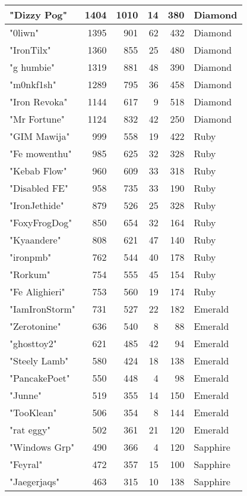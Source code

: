 \documentclass{article}
\begin{document}
\begin{table}[htbp]
\begin{tabular}{|l|r|r|r|r|l|}
"Dizzy Pog" & 1404 & 1010 & 14 & 380 & Diamond \\ \hline
"0liwn" & 1395 & 901 & 62 & 432 & Diamond \\ \hline
"IronTilx" & 1360 & 855 & 25 & 480 & Diamond \\ \hline
"g humbie" & 1319 & 881 & 48 & 390 & Diamond \\ \hline
"m0nkf1sh" & 1289 & 795 & 36 & 458 & Diamond \\ \hline
"Iron Revoka" & 1144 & 617 & 9 & 518 & Diamond \\ \hline
"Mr Fortune" & 1124 & 832 & 42 & 250 & Diamond \\ \hline
"GIM Mawija" & 999 & 558 & 19 & 422 & Ruby \\ \hline
"Fe mowenthu" & 985 & 625 & 32 & 328 & Ruby \\ \hline
"Kebab Flow" & 960 & 609 & 33 & 318 & Ruby \\ \hline
"Disabled FE" & 958 & 735 & 33 & 190 & Ruby \\ \hline
"IronJethide" & 879 & 526 & 25 & 328 & Ruby \\ \hline
"FoxyFrogDog" & 850 & 654 & 32 & 164 & Ruby \\ \hline
"Kyaandere" & 808 & 621 & 47 & 140 & Ruby \\ \hline
"ironpmb" & 762 & 544 & 40 & 178 & Ruby \\ \hline
"Rorkum" & 754 & 555 & 45 & 154 & Ruby \\ \hline
"Fe Alighieri" & 753 & 560 & 19 & 174 & Ruby \\ \hline
"IamIronStorm" & 731 & 527 & 22 & 182 & Emerald \\ \hline
"Zerotonine" & 636 & 540 & 8 & 88 & Emerald \\ \hline
"ghosttoy2" & 621 & 485 & 42 & 94 & Emerald \\ \hline
"Steely Lamb" & 580 & 424 & 18 & 138 & Emerald \\ \hline
"PancakePoet" & 550 & 448 & 4 & 98 & Emerald \\ \hline
"Junne" & 519 & 355 & 14 & 150 & Emerald \\ \hline
"TooKlean" & 506 & 354 & 8 & 144 & Emerald \\ \hline
"rat eggy" & 502 & 361 & 21 & 120 & Emerald \\ \hline
"Windows Grp" & 490 & 366 & 4 & 120 & Sapphire \\ \hline
"Feyral" & 472 & 357 & 15 & 100 & Sapphire \\ \hline
"Jaegerjaqs" & 463 & 315 & 10 & 138 & Sapphire \\ \hline

\end{tabular}
\end{table}
\end{document}
